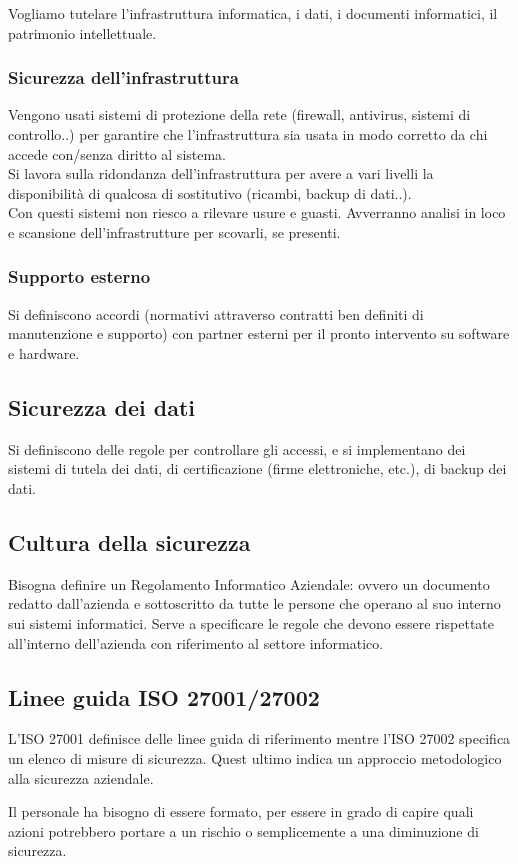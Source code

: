 Vogliamo tutelare l'infrastruttura informatica, i dati, i documenti
informatici, il patrimonio intellettuale.

\subsubsection{Sicurezza dell'infrastruttura}

Vengono usati sistemi di protezione della rete (firewall, antivirus,
sistemi di controllo..) per garantire che l'infrastruttura sia usata in
modo corretto da chi accede con/senza diritto al sistema.\\
Si lavora sulla ridondanza dell'infrastruttura per avere a vari livelli
la disponibilit\`a di qualcosa di sostitutivo (ricambi, backup di dati..).\\
Con questi sistemi non riesco a rilevare usure e guasti. Avverranno
analisi in loco e scansione dell'infrastrutture per scovarli, se
presenti.

\subsubsection{Supporto esterno}

Si definiscono accordi (normativi attraverso contratti ben definiti di
manutenzione e supporto) con partner esterni per il pronto intervento su
software e hardware.

\subsection{Sicurezza dei dati}

Si definiscono delle regole per controllare gli accessi, e si implementano dei
sistemi di tutela dei dati, di certificazione (firme elettroniche, etc.), di
backup dei dati.

\subsection{Cultura della sicurezza}

Bisogna definire un Regolamento Informatico Aziendale: ovvero un documento
redatto dall'azienda e sottoscritto da tutte le persone che operano al suo
interno sui sistemi informatici. Serve a specificare le regole che devono
essere rispettate all'interno dell'azienda con riferimento al settore
informatico.

\subsection{Linee guida ISO 27001/27002}

L'ISO 27001 definisce delle linee guida di riferimento mentre l'ISO 27002
specifica un elenco di misure di sicurezza. Quest ultimo indica un approccio
metodologico alla sicurezza aziendale.

Il personale ha bisogno di essere formato, per essere in grado di capire quali
azioni potrebbero portare a un rischio o semplicemente a una diminuzione di
sicurezza.
